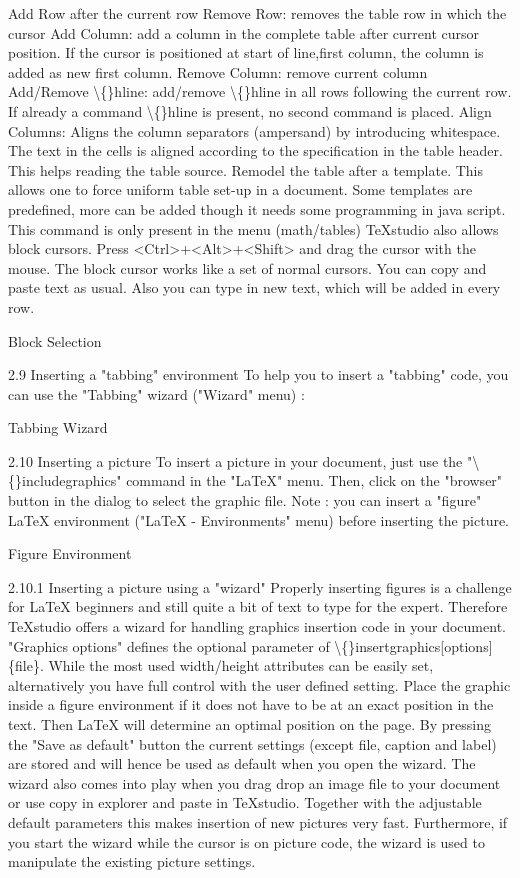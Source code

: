 \documentclass{article}
\begin{document}
	Add Row after the current row
	Remove Row: removes the table row in which the cursor
	Add Column: add a column in the complete table after current cursor position. If the cursor is positioned at start of line,first column, the column is added as new first column.
	Remove Column: remove current column
	Add/Remove \textbackslash\{\}hline: add/remove \textbackslash\{\}hline in all rows following the current row. If already a command \textbackslash\{\}hline is present, no second command is placed.
	Align Columns: Aligns the column separators (ampersand) by introducing whitespace. The text in the cells is aligned according to the specification in the table header. This helps reading the table source.
	Remodel the table after a template. This allows one to force uniform table set-up in a document. Some templates are predefined, more can be added though it needs some programming in java script. This command is only present in the menu (math/tables)
	TeXstudio also allows block cursors. Press <Ctrl>+<Alt>+<Shift> and drag the cursor with the mouse. The block cursor works like a set of normal cursors. You can copy and paste text as usual. Also you can type in new text, which will be added in every row.
	
	Block Selection
	
	2.9 Inserting a "tabbing" environment
	To help you to insert a "tabbing" code, you can use the "Tabbing" wizard ("Wizard" menu) :
	
	Tabbing Wizard
	
	2.10 Inserting a picture
	To insert a picture in your document, just use the "\textbackslash\{\}includegraphics" command in the "LaTeX" menu. Then, click on the "browser" button in the dialog to select the graphic file.
	Note : you can insert a "figure" LaTeX environment ("LaTeX - Environments" menu) before inserting the picture.
	
	Figure Environment
	
	2.10.1 Inserting a picture using a "wizard"
	Properly inserting figures is a challenge for LaTeX beginners and still quite a bit of text to type for the expert. Therefore TeXstudio offers a wizard for handling graphics insertion code in your document. "Graphics options" defines the optional parameter of \textbackslash\{\}insertgraphics[options]\{file\}. While the most used width/height attributes can be easily set, alternatively you have full control with the user defined setting.
	Place the graphic inside a figure environment if it does not have to be at an exact position in the text. Then LaTeX will determine an optimal position on the page.
	By pressing the "Save as default" button the current settings (except file, caption and label) are stored and will hence be used as default when you open the wizard.
	The wizard also comes into play when you drag drop an image file to your document or use copy in explorer and paste in TeXstudio. Together with the adjustable default parameters this makes insertion of new pictures very fast. Furthermore, if you start the wizard while the cursor is on picture code, the wizard is used to manipulate the existing picture settings.
	
\end{document}
